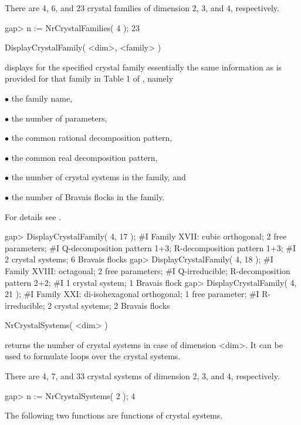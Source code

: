 There are 4, 6, and 23 crystal families of dimension 2, 3, and 4,
respectively.

\beginexample
gap> n := NrCrystalFamilies( 4 );
23
\endexample

\>DisplayCrystalFamily( <dim>, <family> )

displays for the specified crystal family essentially the same
information as is provided for that family in Table 1 of
\cite{BBNWZ78}, namely

\beginlist%
\item{$\bullet$} the family name,

\item{$\bullet$} the number of parameters,

\item{$\bullet$} the common rational decomposition pattern,

\item{$\bullet$} the common real decomposition pattern,

\item{$\bullet$} the number of crystal systems in the family, and

\item{$\bullet$} the number of Bravais flocks in the family.
\endlist

For details see \cite{BBNWZ78}.

\beginexample
gap> DisplayCrystalFamily( 4, 17 );
#I Family XVII: cubic orthogonal; 2 free parameters;
#I  Q-decomposition pattern 1+3; R-decomposition pattern 1+3;
#I  2 crystal systems; 6 Bravais flocks
gap> DisplayCrystalFamily( 4, 18 );
#I Family XVIII: octagonal; 2 free parameters;
#I  Q-irreducible; R-decomposition pattern 2+2;
#I  1 crystal system; 1 Bravais flock
gap> DisplayCrystalFamily( 4, 21 );
#I Family XXI: di-isohexagonal orthogonal; 1 free parameter;
#I  R-irreducible; 2 crystal systems; 2 Bravais flocks
\endexample


\>NrCrystalSystems( <dim> )

returns the number of crystal systems in case of dimension <dim>. It
can be used to formulate loops over the crystal systems.

There are 4, 7, and 33 crystal systems of dimension 2, 3, and 4,
respectively.

\beginexample
gap> n := NrCrystalSystems( 2 );
4
\endexample

The following two functions are functions of crystal systems.

